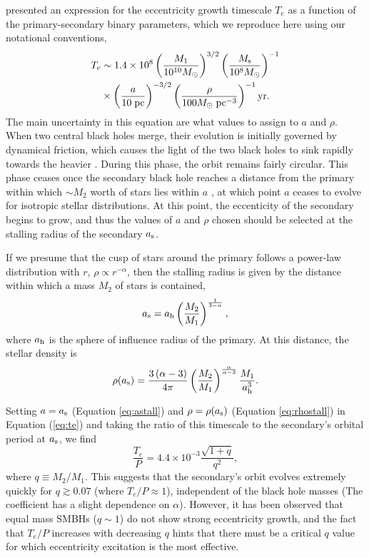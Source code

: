 \documentclass[a4paper,twocolumn]{emulateapj}
\begin{document}
\citet{Iwasawa:2011cv} presented an expression for the eccentricity growth timescale $T_{e}$ as a function of the primary-secondary binary parameters, which we reproduce here using our notational conventions,
\begin{align}
T_{e} &\sim 1.4 \times 10^{8} \left(\frac{M_{1}}{10^{10} M_{\odot}}\right)^{3/2}\left(\frac{M_{\rm s}}{10^{8} M_{\odot}}\right)^{-1}\nonumber\\
&\times \left(\frac{a}{10\;{\rm pc}}\right)^{-3/2}\left(\frac{\rho}{100 M_{\odot}\;{\rm pc}^{-3}}\right)^{-1} {\rm yr}.
\label{eq:te}
\end{align}
The main uncertainty in this equation are what values to assign to $a$ and $\rho$. When two central black holes merge, their evolution is initially governed by dynamical friction, which causes the light of the two black holes to sink rapidly towards the heavier \citep{Dotti:2012bn}. During this phase, the orbit remains fairly circular. This phase ceases once the secondary black hole reaches a distance from the primary within which $\sim M_{2}$ worth of stars lies within $a$ \citep{Matsubayashi:2007dx}, at which point $a$ ceases to evolve for isotropic stellar distributions. At this point, the eccenticity of the secondary begins to grow, and thus the values of $a$ and $\rho$ chosen should be selected at the stalling radius of the secondary $a_{\rm s}$.

If we presume that the cusp of stars around the primary follows a power-law distribution with $r$, $\rho \propto r^{-\alpha}$, then the stalling radius is given by the distance within which a mass $M_{2}$ of stars is contained,
\begin{equation}
a_{\rm s} = a_{\rm h} \left(\frac{M_{2}}{M_{1}}\right)^{\frac{1}{3-\alpha}},
\label{eq:astall}
\end{equation}
where $a_{\rm h}$ is the sphere of influence radius of the primary. At this distance, the stellar density is
\begin{equation}
\rho(a_{\rm s}) = \frac{3 \left(\alpha - 3\right)}{4 \pi} \left(\frac{M_{2}}{M_{1}}\right)^{\frac{\alpha}{\alpha - 3}} \frac{M_{1}}{a_{\rm h}^{3}}.
\label{eq:rhostall}
\end{equation}

Setting $a = a_{\rm s}$ (Equation \ref{eq:astall}) and $\rho = \rho(a_{\rm s})$ (Equation \ref{eq:rhostall}) in Equation (\ref{eq:te}) and taking the ratio of this timescale to the secondary's orbital period at $a_{\rm s}$, we find
\begin{equation}
\frac{T_{e}}{P} = 4.4 \times 10^{-3} \frac{\sqrt{1 + q}}{q^{2}},
\end{equation}
where $q \equiv M_{2}/M_{1}$. This suggests that the secondary's orbit evolves extremely quickly for $q \gtrsim 0.07$ (where $T_{e}/P \approx 1$), independent of the black hole masses (The coefficient has a slight dependence on $\alpha$). However, it has been observed that equal mass SMBHs ($q \sim 1$) do not show strong eccentricity growth, and the fact that $T_{e}/P$ increases with decreasing $q$ hints that there must be a critical $q$ value for which eccentricity excitation is the most effective. 
\end{document}
